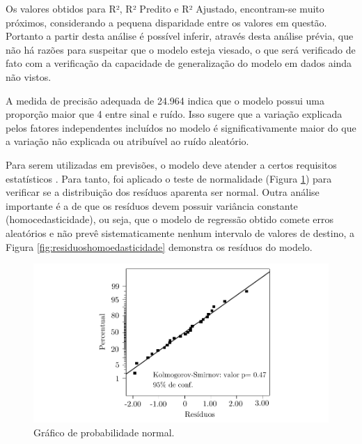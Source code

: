 Os valores obtidos para  R², R² Predito e R² Ajustado, encontram-se muito próximos, considerando a pequena disparidade entre os valores em questão. Portanto a partir desta análise é possível inferir, através desta análise prévia, que não há razões para suspeitar que o modelo esteja viesado, o que será verificado de fato com a verificação da capacidade de generalização do modelo em dados ainda não vistos.

A medida de precisão adequada de 24.964 indica que o modelo possui uma proporção maior que 4 entre sinal e ruído. Isso sugere que a variação explicada pelos fatores independentes incluídos no modelo é significativamente maior do que a variação não explicada ou atribuível ao ruído aleatório.

Para serem utilizadas em previsões, o modelo deve atender a certos requisitos estatísticos \cite{montgomery}. Para tanto, foi aplicado o teste de normalidade (Figura \ref{fig:testeprobnormal}) para verificar se a distribuição dos resíduos aparenta ser normal.  Outra análise importante é a de que os resíduos devem possuir variância constante (homocedasticidade), ou seja, que o modelo de regressão obtido comete erros aleatórios e não prevê sistematicamente nenhum intervalo de valores de destino, a Figura \ref{fig:residuoshomoedasticidade} demonstra os resíduos do modelo.


\begin{figure}[H] 
    \centering  
    \includegraphics{Figuras/probnormal.pdf}  
    \caption{Gráfico de probabilidade normal.}  
    \label{fig:testeprobnormal}  
\end{figure}

